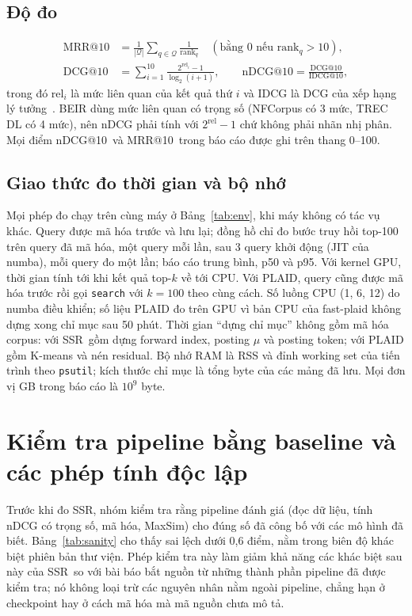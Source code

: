 \documentclass[a4paper,13pt]{extreport}
\makeatletter
\theoremstyle{plain}
\newcommand{\ssr}{SSR}
\newcommand{\ndcg}{nDCG@10}
\newcommand{\mrr}{MRR@10}
\makeatother
\begin{document}
\subsection{Độ đo}
\label{sec:metrics}
\begin{align}
\mathrm{MRR@10}&=\frac{1}{|\mathcal{Q}|}\sum_{q\in\mathcal{Q}}\frac{1}{\mathrm{rank}_q}\quad(\text{bằng 0 nếu }\mathrm{rank}_q>10), \label{eq:mrr}\\
\mathrm{DCG@10}&=\sum_{i=1}^{10}\frac{2^{\mathrm{rel}_i}-1}{\log_2(i+1)},\qquad \mathrm{nDCG@10}=\frac{\mathrm{DCG@10}}{\mathrm{IDCG@10}}, \label{eq:ndcg}
\end{align}
trong đó $\mathrm{rel}_i$ là mức liên quan của kết quả thứ $i$ và IDCG là DCG của xếp hạng lý tưởng~\cite{jarvelin2002}. BEIR dùng mức liên quan có trọng số (NFCorpus có 3 mức, TREC DL có 4 mức), nên nDCG phải tính với $2^{\mathrm{rel}}-1$ chứ không phải nhãn nhị phân. Mọi điểm \ndcg\ và \mrr\ trong báo cáo được ghi trên thang 0--100.

\subsection{Giao thức đo thời gian và bộ nhớ}
\label{sec:protocol}
Mọi phép đo chạy trên cùng máy ở Bảng~\ref{tab:env}, khi máy không có tác vụ khác. Query được mã hóa trước và lưu lại; đồng hồ chỉ đo bước truy hồi top-100 trên query đã mã hóa, một query mỗi lần, sau 3 query khởi động (JIT của numba), mỗi query đo một lần; báo cáo trung bình, p50 và p95. Với kernel GPU, thời gian tính tới khi kết quả top-$k$ về tới CPU. Với PLAID, query cũng được mã hóa trước rồi gọi \texttt{search} với $k=100$ theo cùng cách. Số luồng CPU (1, 6, 12) do numba điều khiển; số liệu PLAID đo trên GPU vì bản CPU của fast-plaid không dựng xong chỉ mục sau 50 phút. Thời gian ``dựng chỉ mục'' không gồm mã hóa corpus: với \ssr\ gồm dựng forward index, posting $\mu$ và posting token; với PLAID gồm K-means và nén residual. Bộ nhớ RAM là RSS và đỉnh working set của tiến trình theo \texttt{psutil}; kích thước chỉ mục là tổng byte của các mảng đã lưu. Mọi đơn vị GB trong báo cáo là $10^9$ byte.

\section{Kiểm tra pipeline bằng baseline và các phép tính độc lập}
\label{sec:sanity}
Trước khi đo \ssr, nhóm kiểm tra rằng pipeline đánh giá (đọc dữ liệu, tính nDCG có trọng số, mã hóa, MaxSim) cho đúng số đã công bố với các mô hình đã biết. Bảng~\ref{tab:sanity} cho thấy sai lệch dưới 0,6 điểm, nằm trong biên độ khác biệt phiên bản thư viện. Phép kiểm tra này làm giảm khả năng các khác biệt sau này của \ssr\ so với bài báo bắt nguồn từ những thành phần pipeline đã được kiểm tra; nó không loại trừ các nguyên nhân nằm ngoài pipeline, chẳng hạn ở checkpoint hay ở cách mã hóa mà mã nguồn chưa mô tả.
\end{document}
